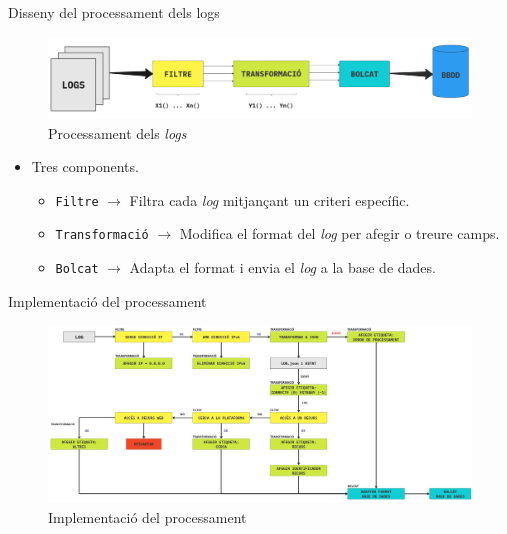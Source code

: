 \begin{frame}{Disseny del processament dels logs}

    \begin{figure}
        \includegraphics[width=\textwidth]{figures/log-processing}
        \caption{Processament dels \textit{logs}}\label{fig:log-processing}
    \end{figure}

    \begin{itemize}%
        \item Tres components.
        \begin{itemize}%
            \item \texttt{Filtre} \(\rightarrow\) Filtra cada \textit{log} mitjançant un criteri específic.
            \item \texttt{Transformació} \(\rightarrow\) Modifica el format del \textit{log} per afegir o treure camps.
            \item \texttt{Bolcat} \(\rightarrow\) Adapta el format i envia el \textit{log} a la base de dades.
        \end{itemize}
    \end{itemize}
\end{frame}


\begin{frame}{Implementació del processament}
    \begin{figure}
        \includegraphics[width=1\textwidth]{figures/log-processing-workflow}
        \caption{Implementació del processament}\label{fig:log-processing-workflow}
    \end{figure}
\end{frame}



